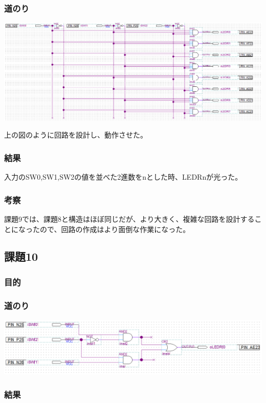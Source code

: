 \documentclass[a4paper]{jarticle}
\begin{document}
\subsubsection{道のり}
\begin{center}
	\includegraphics[width=15cm]{work9.PNG}
\end{center}
上の図のように回路を設計し、動作させた。
\subsubsection{結果}
入力のSW0,SW1,SW2の値を並べた2進数をnとした時、LEDRnが光った。
\subsubsection{考察}
課題9では、課題8と構造はほぼ同じだが、より大きく、複雑な回路を設計することになったので、回路の作成はより面倒な作業になった。
\subsection{課題10}
\subsubsection{目的}
\subsubsection{道のり}
\begin{center}
	\includegraphics[width=15cm]{work10.PNG}
\end{center}
\subsubsection{結果}
\end{document}
